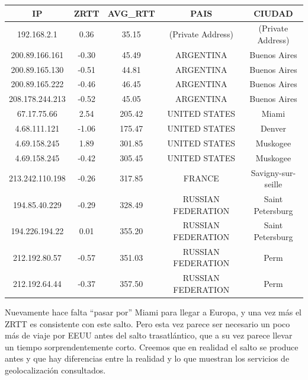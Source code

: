 \begin{tabular}{|c@{\hspace{5ex}}c@{\hspace{5ex}}c@{\hspace{5ex}}c@{\hspace{5ex}}c|}
 \hline
 \rule{0pt}{1.2em}IP & ZRTT & AVG\_RTT & PAIS & CIUDAD\\[0.2em]
 \hline

\rule{0pt}{1.2em} 192.168.2.1  &  0.36 & 35.15 & (Private Address) & (Private Address) \\[0.2em]
\rule{0pt}{1.2em} 200.89.166.161  &  -0.30 & 45.49 & ARGENTINA & Buenos Aires \\[0.2em]
\rule{0pt}{1.2em} 200.89.165.130  &  -0.51 & 44.81 & ARGENTINA & Buenos Aires \\[0.2em]
\rule{0pt}{1.2em} 200.89.165.222  &  -0.46 & 46.45 & ARGENTINA & Buenos Aires \\[0.2em]
\rule{0pt}{1.2em} 208.178.244.213  &  -0.52 & 45.05 & ARGENTINA & Buenos Aires \\[0.2em]
\rule{0pt}{1.2em} 67.17.75.66  &  2.54 & 205.42 & UNITED STATES & Miami \\[0.2em]
\rule{0pt}{1.2em} 4.68.111.121  &  -1.06 & 175.47 & UNITED STATES & Denver \\[0.2em]
\rule{0pt}{1.2em} 4.69.158.245  &  1.89 & 301.85 & UNITED STATES & Muskogee \\[0.2em]
\rule{0pt}{1.2em} 4.69.158.245  &  -0.42 & 305.45 & UNITED STATES & Muskogee \\[0.2em]
\rule{0pt}{1.2em} 213.242.110.198  &  -0.26 & 317.85 & FRANCE & Savigny-sur-seille \\[0.2em]
\rule{0pt}{1.2em} 194.85.40.229  &  -0.29 & 328.49 & RUSSIAN FEDERATION & Saint Petersburg \\[0.2em]
\rule{0pt}{1.2em} 194.226.194.22  &  0.01 & 355.20 & RUSSIAN FEDERATION & Saint Petersburg \\[0.2em]
\rule{0pt}{1.2em} 212.192.80.57  &  -0.57 & 351.03 & RUSSIAN FEDERATION & Perm \\[0.2em]
\rule{0pt}{1.2em} 212.192.64.44  &  -0.37 & 357.50 & RUSSIAN FEDERATION & Perm \\[0.2em]
\hline
 \end{tabular}

 Nuevamente hace falta ``pasar por'' Miami para llegar a Europa, y una vez más el ZRTT es consistente con este salto. Pero esta vez parece ser necesario un poco más de viaje por EEUU antes del salto trasatlántico, que a su vez parece llevar un tiempo sorprendentemente corto. Creemos que en realidad el salto se produce antes y que hay diferencias entre la realidad y lo que muestran los servicios de geolocalización consultados.

